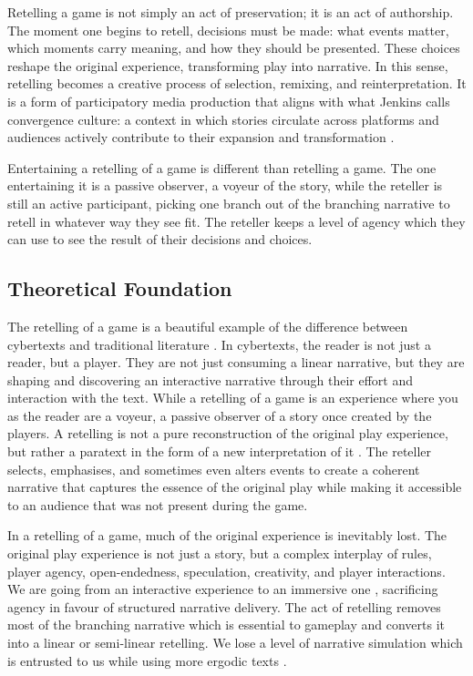 Retelling a game is not simply an act of preservation; it is an act of authorship. The moment one begins to retell, decisions must be made: what events matter, which moments carry meaning, and how they should be presented. These choices reshape the original experience, transforming play into narrative. In this sense, retelling becomes a creative process of selection, remixing, and reinterpretation. It is a form of participatory media production that aligns with what Jenkins calls convergence culture: a context in which stories circulate across platforms and audiences actively contribute to their expansion and transformation \cite{jenkins2008convergence}.

Entertaining a retelling of a game is different than retelling a game. The one entertaining it is a passive observer, a voyeur of the story, while the reteller is still an active participant, picking one branch out of the branching narrative to retell in whatever way they see fit. The reteller keeps a level of agency which they can use to see the result of their decisions and choices.

\subsection*{Theoretical Foundation}
The retelling of a game is a beautiful example of the difference between cybertexts and traditional literature \cite{aarseth1995cybertext}. In cybertexts, the reader is not just a reader, but a player. They are not just consuming a linear narrative, but they are shaping and discovering an interactive narrative through their effort and interaction with the text. While a retelling of a game is an experience where you as the reader are a voyeur, a passive observer of a story once created by the players. A retelling is not a pure reconstruction of the original play experience, but rather a paratext in the form of a new interpretation of it \cite{gray2010show}. The reteller selects, emphasises, and sometimes even alters events to create a coherent narrative that captures the essence of the original play while making it accessible to an audience that was not present during the game.

In a retelling of a game, much of the original experience is inevitably lost. The original play experience is not just a story, but a complex interplay of rules, player agency, open-endedness, speculation, creativity, and player interactions. We are going from an interactive experience to an immersive one \cite{ryan2015narrative}, sacrificing agency in favour of structured narrative delivery. The act of retelling removes most of the branching narrative which is essential to gameplay and converts it into a linear or semi-linear retelling. We lose a level of narrative simulation which is entrusted to us while using more ergodic texts \cite{aarseth1995cybertext}.

